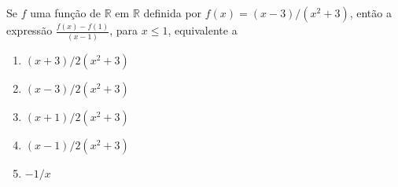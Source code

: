 \item  Se $f$  uma função de $\mathbb{R}$ em $\mathbb{R}$ definida por
  $f(x)=(x-3)/(x^2+3)$, então a expressão $\frac{f(x)-f(1)}{(x-1)}$,
  para $x\leq 1$,  equivalente a
  \begin{multicols}{2}
	\begin{enumerate}
	  \item  $(x + 3)/2(x^2 + 3)$
	  \item $(x - 3)/2(x^2 + 3)$
	  \item $ (x + 1)/2(x^2 + 3)$
	  \item $ (x - 1)/2(x^2 + 3)$
	  \item $-1/x$
	\end{enumerate}
  \end{multicols}

